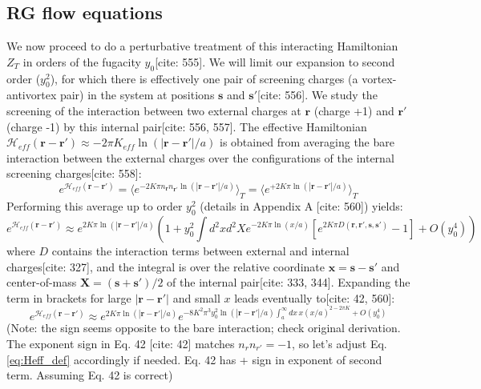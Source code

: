 \documentclass[11pt]{article}
\begin{document}
\subsection{RG flow equations}

We now proceed to do a perturbative treatment of this interacting Hamiltonian $Z_T$ in orders of the fugacity $y_0$[cite: 555]. We will limit our expansion to second order ($y_0^2$), for which there is effectively one pair of screening charges (a vortex-antivortex pair) in the system at positions $\mathbf{s}$ and $\mathbf{s}'$[cite: 556]. We study the screening of the interaction between two external charges at $\mathbf{r}$ (charge +1) and $\mathbf{r}'$ (charge -1) by this internal pair[cite: 556, 557]. The effective Hamiltonian $\mathcal{H}_{eff}(\mathbf{r}-\mathbf{r}') \approx -2\pi K_{eff} \ln(|\mathbf{r}-\mathbf{r}'|/a)$ is obtained from averaging the bare interaction between the external charges over the configurations of the internal screening charges[cite: 558]:
\begin{equation}
e^{\mathcal{H}_{eff}(\mathbf{r}-\mathbf{r}')} = \langle e^{-2 K \pi n_{\mathbf{r}} n_{\mathbf{r}'} \ln(|\mathbf{r}-\mathbf{r}'|/a)} \rangle_T = \langle e^{+2 K \pi \ln(|\mathbf{r}-\mathbf{r}'|/a)} \rangle_T \label{eq:Heff_def}
\end{equation}
Performing this average up to order $y_0^2$ (details in Appendix A [cite: 560]) yields:
\begin{equation}
e^{\mathcal{H}_{eff}(\mathbf{r}-\mathbf{r}')} \approx e^{2 K \pi \ln(|\mathbf{r}-\mathbf{r}'|/a)} \left( 1 + y_0^2 \int d^2x d^2X e^{-2K\pi \ln(x/a)} [e^{2K\pi D(\mathbf{r},\mathbf{r}',\mathbf{s},\mathbf{s}')} - 1] + O(y_0^4) \right) \label{eq:Heff_expand}
\end{equation}
where $D$ contains the interaction terms between external and internal charges[cite: 327], and the integral is over the relative coordinate $\mathbf{x} = \mathbf{s} - \mathbf{s}'$ and center-of-mass $\mathbf{X} = (\mathbf{s}+\mathbf{s}')/2$ of the internal pair[cite: 333, 344]. Expanding the term in brackets for large $|\mathbf{r}-\mathbf{r}'|$ and small $x$ leads eventually to[cite: 42, 560]:
\begin{equation}
e^{\mathcal{H}_{eff}(\mathbf{r}-\mathbf{r}')} \approx e^{2 K \pi \ln(|\mathbf{r}-\mathbf{r}'|/a)} e^{-8 K^2 \pi^3 y_0^2 \ln(|\mathbf{r}-\mathbf{r}'|/a) \int_a^\infty dx \, x (x/a)^{2-2\pi K} + O(y_0^4)} \label{eq:Heff_result}
\end{equation}
(Note: the sign seems opposite to the bare interaction; check original derivation. The exponent sign in Eq. 42 [cite: 42] matches $n_r n_{r'} = -1$, so let's adjust Eq. \ref{eq:Heff_def} accordingly if needed. Eq. 42 has + sign in exponent of second term. Assuming Eq. 42 is correct)
\end{document}
